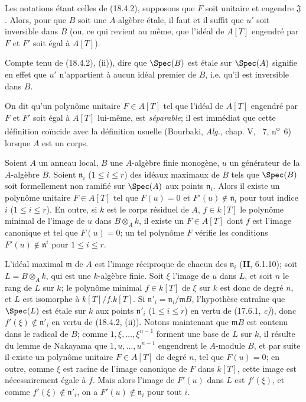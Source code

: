 \begin{corollary}[18.4.3]
Les notations étant celles de \textup{(18.4.2)}, supposons que $F$ soit unitaire et engendre $\mathfrak J$. Alors, pour que $B$ soit une $A$-algèbre étale, il faut et il suffit que $u'$ soit inversible dans $B$ \textup{(ou, ce qui revient au même, que l'idéal de $A[T]$ engendré par $F$ et $F'$ soit égal à $A[T]$)}.
\end{corollary}

Compte tenu de (18.4.2), (ii)), dire que $\Spec(B)$ est étale sur $\Spec(A)$ signifie en effet que $u'$ n'appartient à aucun idéal premier de $B$, i.e. qu'il est inversible dans $B$.

On dit qu'un polynôme unitaire $F\in A[T]$ tel que l'idéal de $A[T]$ engendré par $F$ et $F'$ soit égal à $A[T]$ lui-même, est \emph{séparable}; il est immédiat que cette définition coïncide avec la définition usuelle (Bourbaki, \emph{Alg.}, chap. V, \textsection~7, n\textsuperscript{o}~6) lorsque $A$ est un corps.

\begin{lemma}[18.4.4]
\label{IV.18.4.4}
Soient $A$ un anneau local, $B$ une $A$-algèbre finie monogène, $u$ un générateur de la $A$-algèbre $B$. Soient $\mathfrak n_i$ \textup{(}$1\leq i\leq r$\textup{)} des idéaux maximaux de $B$ tels que $\Spec(B)$ soit formellement non ramifié sur $\Spec(A)$ aux points $\mathfrak n_i$. Alors il existe un polynôme unitaire $F\in A[T]$ tel que $F(u)=0$ et $F'(u)\notin\mathfrak n_i$ pour tout indice $i$ \textup{(}$1\leq i\leq r$\textup{)}. En outre, si $k$ est le corps
résiduel de $A$, $f\in k[T]$ le polynôme minimal de l'image de $u$ dans $B\otimes_A k$, il existe un $F\in A[T]$ dont $f$ est l'image canonique et tel que $F(u)=0$; un tel polynôme $F$ vérifie les conditions $F'(u)\notin\mathfrak n^i$ pour $1\leq i\leq r$.
\end{lemma}

L'idéal maximal $\mathfrak m$ de $A$ est l'image réciproque de chacun des $\mathfrak n_i$ (\textbf{II}, 6.1.10); soit $L=B\otimes_A k$, qui est une $k$-algèbre finie. Soit $\xi$ l'image de $u$ dans $L$, et soit $n$ le rang de $L$ sur $k$; le polynôme minimal $f\in k[T]$ de $\xi$ sur $k$ est donc de degré $n$, et $L$ est isomorphe à $k[T]/f.k[T]$. Si $\mathfrak n'_i=\mathfrak n_i/\mathfrak mB$, l'hypothèse entraîne que $\Spec(L)$ est étale sur $k$ aux points $\mathfrak n'_i$ ($1\leq i\leq r$) en vertu de (17.6.1, \emph{c)}), donc $f'(\xi)\notin\mathfrak n'_i$ en vertu de (18.4.2, (ii)). Notons maintenant que $\mathfrak mB$ est contenu dans le radical de $B$; comme $1,\xi,\ldots,\xi^{n-1}$ forment une base de $L$ sur $k$, il résulte du lemme de Nakayama que $1,u,\ldots,u^{n-1}$ engendrent le $A$-module $B$, et par suite il existe un polynôme unitaire $F\in A[T]$ de degré $n$, tel que $F(u)=0$; en outre, comme $\xi$ est racine de l'image canonique de $F$ dans $k[T]$, cette image est nécessairement égale à $f$. Mais alors l'image de $F'(u)$ dans $L$ est $f'(\xi)$, et comme $f'(\xi)\notin\mathfrak n'_i$, on a $F'(u)\notin\mathfrak n_i$ pour tout $i$.

